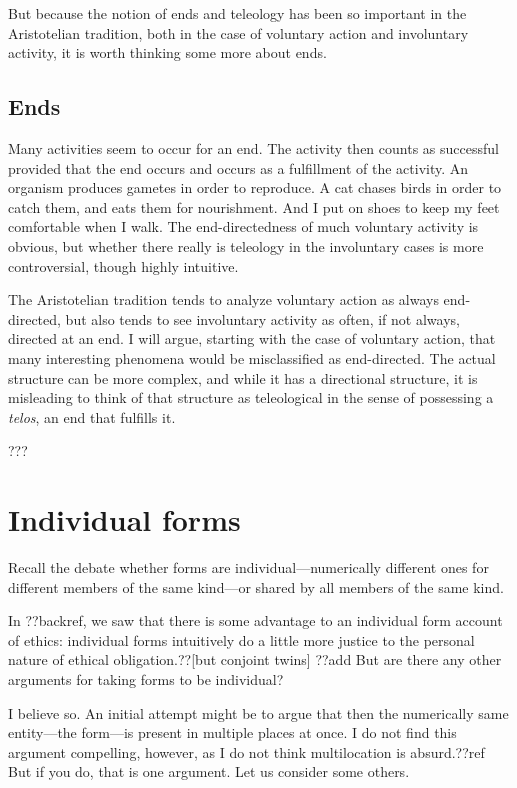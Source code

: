 But because the notion of ends and teleology has been so important in the Aristotelian tradition, both in the case of voluntary 
action and involuntary activity, it is worth thinking some more about ends.

\subsection{Ends}
Many activities seem to occur for an end. The activity then counts as successful provided that the end occurs and occurs as a
fulfillment of the activity. An organism produces gametes in order to reproduce. A cat chases birds in order to catch them,
and eats them for nourishment. And I put on shoes to keep my feet comfortable when I walk. The end-directedness of much voluntary
activity is obvious, but whether there really is teleology in the involuntary cases is more controversial, though highly intuitive.

The Aristotelian tradition tends to analyze voluntary action as always end-directed, but also tends to see involuntary activity as 
often, if not always, directed at an end. I will argue, starting with the case of voluntary action, that many interesting phenomena 
would be misclassified as end-directed. The actual structure can be more complex, and while it has a directional structure, it is
misleading to think of that structure as teleological in the sense of possessing a \textit{telos}, an end that fulfills it.

???

\section{Individual forms}
Recall the debate whether forms are individual---numerically different ones for different members of the same kind---or shared
by all members of the same kind.

In ??backref, we saw that there is some advantage to an individual form account of ethics: individual forms intuitively do 
a little more justice to the personal nature of ethical obligation.??[but conjoint twins] ??add 
But are there any other arguments for taking forms to be individual?

I believe so. An initial attempt might be to argue that then the numerically same entity---the form---is present in multiple
places at once. I do not find this argument compelling, however, as I do not think multilocation is absurd.??ref But if you
do, that is one argument. Let us consider some others.

